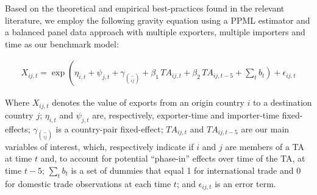 Based on the theoretical and empirical best-practices found in the
relevant literature, we employ the following gravity equation using a
PPML estimator and a balanced panel data approach with multiple
exporters, multiple importers and time as our benchmark model:

\begin{multline}
    X_{ij,t} = \exp\left(\eta_{i,t} + \psi_{j,t} + \gamma_{\binom{-}{ij}} + \beta_{1} \, TA_{ij,t} \right. + \beta_{2} \, TA_{ij,t-5} + \left. \sum_{t} b_{t} \right) + \epsilon_{ij,t}
\end{multline}

Where \(X_{ij,t}\) denotes the value of exports from an origin country
\(i\) to a destination country \(j\); \(\eta_{i,t}\) and \(\psi_{j,t}\)
are, respectively, exporter-time and importer-time fixed-effects;
\(\gamma_{\binom{-}{ij}}\) is a country-pair fixed-effect;
\({TA}_{ij,t}\) and \({TA}_{ij,t - 5}\) are our main variables of
interest, which, respectively indicate if \(i\) and \(j\) are members of
a TA at time \(t\) and, to account for potential ``phase-in'' effects
over time of the TA, at time \(t - 5\); \(\sum_{t}^{}b_{t}\) is a set of
dummies that equal 1 for international trade and 0 for domestic trade
observations at each time \(t\); and \(\epsilon_{ij,t}\) is an error
term.
